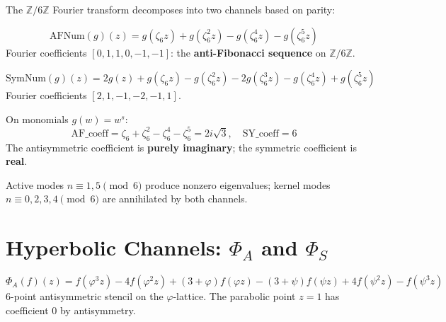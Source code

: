 The $\mathbb{Z}/6\mathbb{Z}$ Fourier transform decomposes into two channels based on parity:

\begin{definition}
\label{def:AFNum}
\leanok
\[
\mathrm{AFNum}(g)(z) = g(\zeta_6 z) + g(\zeta_6^2 z) - g(\zeta_6^4 z) - g(\zeta_6^5 z)
\]
Fourier coefficients $[0, 1, 1, 0, -1, -1]$: the \textbf{anti-Fibonacci sequence} on $\mathbb{Z}/6\mathbb{Z}$.
\end{definition}

\begin{definition}
\label{def:SymNum}
\leanok
\[
\mathrm{SymNum}(g)(z) = 2g(z) + g(\zeta_6 z) - g(\zeta_6^2 z) - 2g(\zeta_6^3 z) - g(\zeta_6^4 z) + g(\zeta_6^5 z)
\]
Fourier coefficients $[2, 1, -1, -2, -1, 1]$.
\end{definition}

\begin{theorem}
\label{thm:channel_coefficients}
\leanok
On monomials $g(w) = w^s$:
\[
\mathrm{AF\_coeff} = \zeta_6 + \zeta_6^2 - \zeta_6^4 - \zeta_6^5 = 2i\sqrt{3}, \quad
\mathrm{SY\_coeff} = 6
\]
The antisymmetric coefficient is \textbf{purely imaginary}; the symmetric coefficient is \textbf{real}.
\end{theorem}

\begin{theorem}
\label{thm:mode_selection}
Active modes $n \equiv 1, 5 \pmod{6}$ produce nonzero eigenvalues; kernel modes $n \equiv 0, 2, 3, 4 \pmod{6}$ are annihilated by both channels.
\end{theorem}

\section{Hyperbolic Channels: \texorpdfstring{$\Phi_A$}{Φ\_A} and \texorpdfstring{$\Phi_S$}{Φ\_S}}
\label{sec:phi_channels}

\begin{definition}
\label{def:PhiA}
\leanok
\[
\Phi_A(f)(z) = f(\varphi^3 z) - 4f(\varphi^2 z) + (3+\varphi)f(\varphi z) - (3+\psi)f(\psi z) + 4f(\psi^2 z) - f(\psi^3 z)
\]
6-point antisymmetric stencil on the $\varphi$-lattice. The parabolic point $z = 1$ has coefficient 0 by antisymmetry.
\end{definition}

